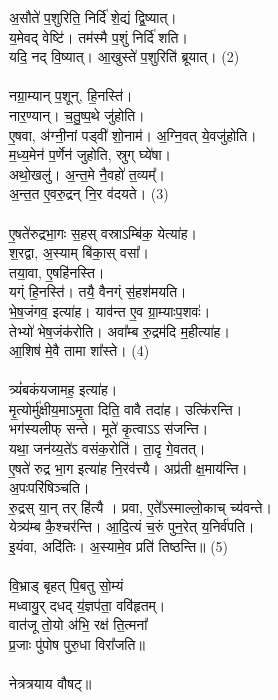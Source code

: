 अ॒सौते॑ प॒शुरिति॒ निर्दि॑ शे॒द्यं द्वि॒ष्यात्। \\
य॒मेवद् वेष्टि॑। तम॑स्मै प॒शुं निर्दि॑ शति। \\
यदि॒ नद् वि॒ष्यात्। आ॒खुस्ते॑ प॒शुरिति॑ ब्रूयात्। (2)\\
\\
नग्रा॒म्यान् प॒शून्, हि॒नस्ति॑। \\
नार॒ण्यान्। च॒तु॒ष्प॒थे जु॑होति।\\
ए॒षवा, अ॑ग्नी॒नां पड्वी॑ शो॒नाम॑। अ॒ग्नि॒वत् ये॒वजु॑होति। \\
म॒ध्य॒मेन॑ प॒र्णेन॑ जुहोति, स्रुग् घ्ये॑षा। \\
अथो॒खलु॑। अ॒न्त॒मे नै॒वहो॑ त॒व्यम्‌᳚। \\
अ॒न्त॒त ए॒वरु॒द्रन् नि॒र व॑दयते। (3)\\
\\
ए॒षते॑रुद्रभा॒गः स॒हस् वस्राऽम्बि॑क॒ येत्या॑ह। \\
श॒रद्वा, अ॒स्याम् बि॑का॒स् वसा᳚। \\
तया॒वा, ए॒षहि॑नस्ति।\\
यग्ं हि॒नस्ति॑। तयै॒ वैनग्ं स॒॑हश॑मयति। \\
भे॒ष॒जंगव॒ इत्या॑ह। याव॑न्त ए॒व ग्रा॒म्याःप॒शवः॑।\\
तेभ्यो॑ भेष॒जंक॑रोति। अवा᳚म्ब रु॒द्रम॑दि म॒हीत्या॑ह। \\
आ॒शिष॑ मे॒वै तामा शा᳚स्ते। (4)\\
\\
त्र्यं॑बकंयजामह॒ इत्या॑ह। \\
मृ॒त्योर्मु॑क्षीय॒माऽमृ॒ता दिति॒ वावै तदा॑ह। उत्कि॑रन्ति।\\
भग॑स्यलीफ् सन्ते। मूते॑ कृ॒त्वाऽऽ स॑जन्ति। \\
यथा॒ जन॑य्य॒ते॑ऽ वसंक॒रोति॑। ता॒दृ गे॒वतत्।\\
ए॒षते॑ रुद्र भा॒ग इत्या॑ह नि॒रव॑त्त्यै। अप्र॑ती क्ष॒माय॑न्ति। \\
अ॒पःपरि॑षिञ्चति। \\
रु॒द्रस् या॒न् तर् हि॑त्यै । प्रवा, ए॒ते᳚ऽस्माल्लो॒काच् च्य॑वन्ते। \\
येत्र्य॑म्ब कै॒श्चर॑न्ति। आ॒दि॒त्यं च॒रुं पुन॒रेत् य॒निर्व॑पति।\\
इ॒यंवा, अदि॑तिः। अ॒स्यामे॒व प्रति॑ तिष्ठन्ति॥ (5)\\
\\
वि॒भ्राड् बृहत् पि॒बतु सो॒म्यं \\
मध्वायु॒र् दधद् य॒॑ज्ञप॑ता॒ ववि॑हृतम्।\\
वात॑जू तो॒यो अ॑भि॒ रक्ष॑ ति॒त्मना᳚ \\
प्र॒जाः पु॑पोष पुरु॒धा विरा᳚जति॥\\
\\
नेत्रत्रयाय वौषट्॥\\
\\
